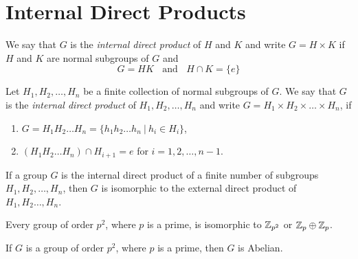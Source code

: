 \section{Internal Direct Products}

\begin{definition}
	We say that $G$ is the \textit{internal direct product} of $H$ and $K$ and write $G = H \times K$ if $H$ and $K$ are normal subgroups of $G$ and
	\[ G = HK\ \ \ \ \text{and}\ \ \ \ H \cap K = \{e\} \]
\end{definition}

\begin{definition}
	Let $H_1, H_2,\dots,H_n$ be a finite collection of normal subgroups of $G$. We say that $G$ is the \textit{internal direct product} of $H_1,H_2,\dots,H_n$ and write $G=H_1\times H_2 \times \dots \times H_n$, if
	\begin{enumerate}
		\item $G = H_1H_2\dots H_n = \{h_1h_2\dots h_n\ \vert\ h_i \in H_i\}$,
		\item $(H_1H_2\dots H_n) \cap H_{i + 1} = {e}$ for $i=1,2,\dots, n-1$.
	\end{enumerate}
\end{definition}

\begin{theorem}
	If a group $G$ is the internal direct product of a finite number of subgroups $H_1,H_2, \dots, H_n$, then $G$ is isomorphic to the external direct product of $H_1,H_2 \dots, H_n$.
\end{theorem}

\begin{theorem}
	Every group of order $p^2$, where $p$ is a prime, is isomorphic to $\mathbb{Z}_{p^2}$ or $\mathbb{Z}_p \oplus \mathbb{Z}_p$.
\end{theorem}

\begin{corollary}
	If $G$ is a group of order $p^2$, where $p$ is a prime, then $G$ is Abelian.
\end{corollary}
